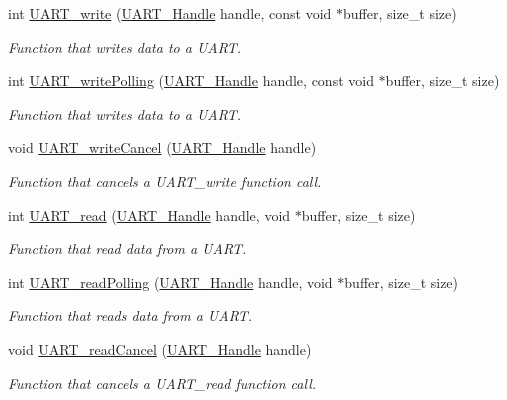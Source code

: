 \begin{DoxyCompactItemize}
int \hyperlink{_u_a_r_t_8h_a6f2a04c09dc17886e69e361cd80aaedc}{U\-A\-R\-T\-\_\-write} (\hyperlink{_u_a_r_t_8h_a13cc669fae768d8212e6491ce71b28af}{U\-A\-R\-T\-\_\-\-Handle} handle, const void $\ast$buffer, size\-\_\-t size)
\begin{DoxyCompactList}\small\item\em Function that writes data to a U\-A\-R\-T. \end{DoxyCompactList}\item 
int \hyperlink{_u_a_r_t_8h_aed09b432b5ebb7d88e78ccfe338e1bd4}{U\-A\-R\-T\-\_\-write\-Polling} (\hyperlink{_u_a_r_t_8h_a13cc669fae768d8212e6491ce71b28af}{U\-A\-R\-T\-\_\-\-Handle} handle, const void $\ast$buffer, size\-\_\-t size)
\begin{DoxyCompactList}\small\item\em Function that writes data to a U\-A\-R\-T. \end{DoxyCompactList}\item 
void \hyperlink{_u_a_r_t_8h_a0482cd0ab9ee7e802c8e785a5754d16d}{U\-A\-R\-T\-\_\-write\-Cancel} (\hyperlink{_u_a_r_t_8h_a13cc669fae768d8212e6491ce71b28af}{U\-A\-R\-T\-\_\-\-Handle} handle)
\begin{DoxyCompactList}\small\item\em Function that cancels a U\-A\-R\-T\-\_\-write function call. \end{DoxyCompactList}\item 
int \hyperlink{_u_a_r_t_8h_a023152d57539cad94bdd813956013e73}{U\-A\-R\-T\-\_\-read} (\hyperlink{_u_a_r_t_8h_a13cc669fae768d8212e6491ce71b28af}{U\-A\-R\-T\-\_\-\-Handle} handle, void $\ast$buffer, size\-\_\-t size)
\begin{DoxyCompactList}\small\item\em Function that read data from a U\-A\-R\-T. \end{DoxyCompactList}\item 
int \hyperlink{_u_a_r_t_8h_aee4c56b20ea1c4c33406d99369db3df1}{U\-A\-R\-T\-\_\-read\-Polling} (\hyperlink{_u_a_r_t_8h_a13cc669fae768d8212e6491ce71b28af}{U\-A\-R\-T\-\_\-\-Handle} handle, void $\ast$buffer, size\-\_\-t size)
\begin{DoxyCompactList}\small\item\em Function that reads data from a U\-A\-R\-T. \end{DoxyCompactList}\item 
void \hyperlink{_u_a_r_t_8h_a51ed7e94d5b409ca1fcb2d65c5a25c3c}{U\-A\-R\-T\-\_\-read\-Cancel} (\hyperlink{_u_a_r_t_8h_a13cc669fae768d8212e6491ce71b28af}{U\-A\-R\-T\-\_\-\-Handle} handle)
\begin{DoxyCompactList}\small\item\em Function that cancels a U\-A\-R\-T\-\_\-read function call. \end{DoxyCompactList}\end{DoxyCompactItemize}


